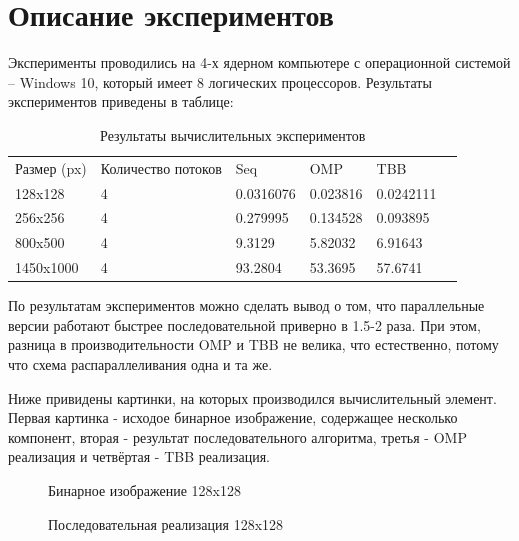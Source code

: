 \documentclass{report}
\begin{document}
\section*{Описание экспериментов}
Эксперименты проводились на 4-х ядерном компьютере с операционной системой – Windows 10, который имеет 8 логических процессоров. Результаты экспериментов приведены в таблице:
\begin{table}[!h]
\caption{Результаты вычислительных экспериментов}
\centering
\begin{tabular}{llllll}
Размер (px) & Количество потоков & Seq & OMP & TBB \\
128x128 & 4 & 0.0316076 & 0.023816 & 0.0242111\\
256x256 & 4 & 0.279995 & 0.134528 & 0.093895\\
800x500 & 4 & 9.3129 & 5.82032 & 6.91643\\
1450x1000 & 4 & 93.2804 & 53.3695 & 57.6741\\
\end{tabular}
\end{table}
\par
По результатам экспериментов можно сделать вывод о том, что параллельные версии работают быстрее последовательной приверно в 1.5-2 раза. При этом, разница в производительности OMP и TBB не велика, что естественно, потому что схема распараллеливания одна и та же.
\par
Ниже привидены картинки, на которых производился вычислительный элемент. Первая картинка - исходое бинарное изображение, содержащее несколько компонент, вторая - результат последовательного алгоритма, третья - OMP реализация и четвёртая - TBB реализация. 

\begin{figure}[H]
\caption{Бинарное изображение 128x128}
\end{figure}

\begin{figure}[H]
\caption{Последовательная реализация 128x128}
\end{figure}
\end{document}
